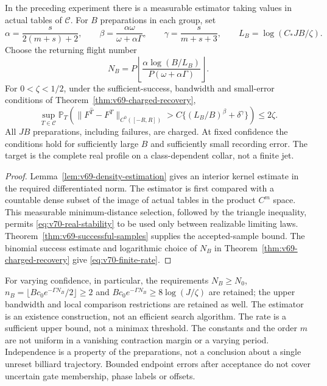 \begin{theorem}
\label{thm:v70-finite}
In the preceding experiment there is a measurable estimator taking values
in actual tables of $\mathscr C$.  For $B$ preparations in each group,
set
\[
 \alpha=\frac{s}{2(m+s)+2},\qquad
 \beta=\frac{\alpha\omega}{\omega+\alpha\Gamma},\qquad
 \gamma=\frac{s}{m+s+3},\qquad L_B=\log(C_*JB/\zeta).
\]
Choose the returning flight number
\[
 N_B=P\left\lfloor
 \frac{\alpha\log(B/L_B)}{P(\omega+\alpha\Gamma)}
 \right\rfloor.
\]
For $0<\zeta<1/2$, under the sufficient-success, bandwidth and
small-error conditions of Theorem~\ref{thm:v69-charged-recovery},
\begin{equation}\label{eq:v70-finite-rate}
 \sup_{T\in\mathscr C}\mathbb P_T\!\left(
 \|F^{\widehat T}-F^T\|_{C^0([-R,R])}>
 C\{(L_B/B)^\beta+\delta^\gamma\}\right)\le2\zeta.
\end{equation}
All $JB$ preparations, including failures, are charged.  At fixed
confidence the conditions hold for sufficiently large $B$ and
sufficiently small recording error.  The target is the complete real
profile on a class-dependent collar, not a finite jet.
\end{theorem}

\begin{proof}
Lemma~\ref{lem:v69-density-estimation} gives an interior kernel estimate
in the required differentiated norm.  The estimator is first compared
with a countable dense subset of the image of actual tables in the
product $C^m$ space.  This measurable minimum-distance selection,
followed by the triangle inequality, permits
\eqref{eq:v70-real-stability} to be used only between realizable
limiting laws.  Theorem~\ref{thm:v69-successful-samples} supplies the
accepted-sample bound.  The binomial success estimate and logarithmic
choice of $N_B$ in Theorem~\ref{thm:v69-charged-recovery} give
\eqref{eq:v70-finite-rate}.
\end{proof}

For varying confidence, in particular, the requirements
$N_B\ge N_0$, $n_B=\lfloor Bc_0e^{-\Gamma N_B}/2\rfloor\ge2$
and $Bc_0e^{-\Gamma N_B}\ge8\log(J/\zeta)$ are retained; the upper
bandwidth and local comparison restrictions are retained as well.
The estimator is an existence construction, not an efficient search
algorithm.  The rate is a sufficient upper bound, not a minimax
threshold.  The constants and the order $m$ are not uniform in a
vanishing contraction margin or a varying period.  Independence is a
property of the preparations, not a conclusion about a single unreset
billiard trajectory.  Bounded endpoint errors after acceptance do not
cover uncertain gate membership, phase labels or offsets.

